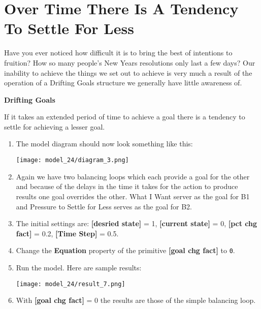 \documentclass[]{memoir}
\makeatletter
\def\maxwidth{\ifdim\Gin@nat@width>\linewidth\linewidth
\else\Gin@nat@width\fi}
\let\Oldincludegraphics\includegraphics
\renewcommand{\includegraphics}[1]{\Oldincludegraphics[width=\maxwidth]{#1}}
\newcommand{\p}[1]{\textbf{{[}#1{]}}}
\newcommand{\e}[1]{\texttt{#1}}
\renewcommand{\a}[1]{\textbf{#1}}
\makeatother
\begin{document}
\section{Over Time There Is A Tendency To Settle For Less}

Have you ever noticed how difficult it is to bring the best of
intentions to fruition? How so many people's New Years resolutions only
last a few days? Our inability to achieve the things we set out to
achieve is very much a result of the operation of a Drifting Goals
structure we generally have little awareness of.

\FloatBarrier 

\begin{oframed}\textbf{Drifting Goals} 

 If it takes an extended period of time to achieve a goal there is a tendency to settle for achieving a lesser goal.

\begin{enumerate}
\item The model diagram should now look something like this: \par \begin{minipage}{\linewidth}  \centering \texttt{[image: model\_24/diagram\_3.png]}
\end{minipage}
\item 

Again we have two balancing loops which each provide a goal for the other and because of the delays in the time it takes for the action to produce results one goal overrides the other. What I Want server as the goal for B1 and Pressure to Settle for Less serves as the goal for B2.


\item 

The initial settings are: \p{desried state} = 1, \p{current state} = 0, \p{pct chg fact} = 0.2, \p{Time Step} = 0.5.


\item  Change the \a{Equation} property of the primitive \p{goal chg fact} to \e{0}.
\item Run the model. Here are sample results:\par \begin{minipage}{\linewidth}  \centering \texttt{[image: model\_24/result\_7.png]}
\end{minipage}
\item 

With \p{goal chg fact} = 0 the results are those of the simple balancing loop.



\end{enumerate}
\end{oframed}
\end{document}
